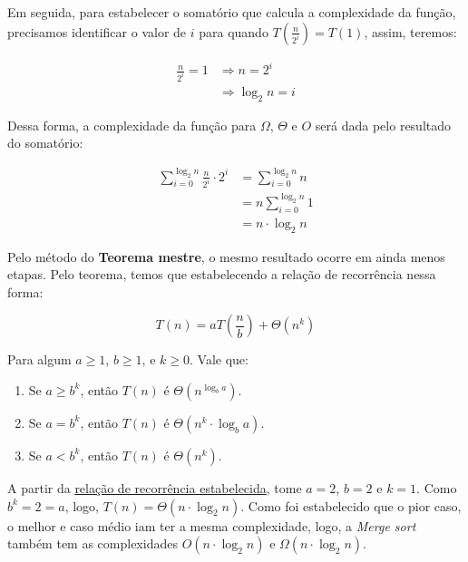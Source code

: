 Em seguida, para estabelecer o somatório que calcula a complexidade da função, precisamos identificar o valor de $i$ para quando $T(\frac{n}{2^i}) = T(1)$, assim, teremos:

\begin{align*}
	\frac{n}{2^i} = 1 & \Longrightarrow n = 2^i      \\
	                  & \Longrightarrow \log_2 n = i
\end{align*}

Dessa forma, a complexidade da função para $\Omega$, $\Theta$ e $O$ será dada pelo resultado do somatório:

\begin{align*}
	\sum_{i = 0}^{\log_2 n} \frac{n}{2^i} \cdot 2^i & = \sum_{i = 0}^{\log_2 n}n  \\
	                                                & = n\sum_{i = 0}^{\log_2 n}1 \\
	                                                & = n \cdot \log_2 n
\end{align*}


Pelo método do \textbf{Teorema mestre}, o mesmo resultado ocorre em ainda menos etapas. Pelo teorema, temos que estabelecendo a relação de recorrência nessa forma:

$$
	T(n) = aT\left(\frac{n}{b}\right) + \Theta\left(n^{k}\right)
$$

Para algum $a \geq 1$, $b \geq 1$, e $k \geq 0$. Vale que:

\begin{enumerate}
	\item Se $a \geq b^k$, então $T(n)$ é $\Theta(n^{\log_b a})$.
	\item Se $a = b^k$, então $T(n)$ é $\Theta(n^k \cdot \log_b a)$.
	\item Se $a < b^k$, então $T(n)$ é $\Theta(n^k)$.
\end{enumerate}

A partir da \href{recc:rec_merge_sort}{relação de recorrência estabelecida}, tome $a = 2$, $b = 2$ e $k = 1$. Como $b^k = 2 = a$, logo, $T(n) = \Theta(n \cdot \log_2 n)$. Como foi estabelecido que o pior caso, o melhor e caso médio iam ter a mesma complexidade, logo, a \textit{Merge sort} também tem as complexidades $O(n \cdot \log_2 n)$ e $\Omega(n \cdot \log_2 n)$.

